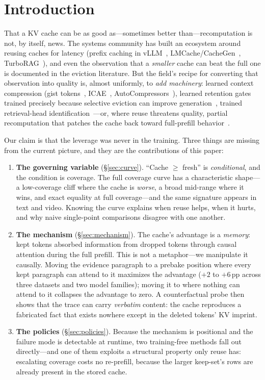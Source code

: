 \documentclass{article} %
\newcommand{\pp}{\,\mathrm{pp}}
\begin{document}
\section{Introduction}
\label{sec:intro}

That a KV cache can be as good as---sometimes better than---recomputation is not, by itself, news. The systems community has built an ecosystem around reusing caches for latency (prefix caching in vLLM~\citep{vllm}, LMCache/CacheGen~\citep{cachegen}, TurboRAG~\citep{turborag}), and even the observation that a \emph{smaller} cache can beat the full one is documented in the eviction literature. But the field's recipe for converting that observation into quality is, almost uniformly, to \emph{add machinery}: learned context compression (gist tokens~\citep{gist}, ICAE~\citep{icae}, AutoCompressors~\citep{autocompressors}), learned retention gates trained precisely because selective eviction can improve generation~\citep{maketokencount}, trained retrieval-head identification~\citep{duoattention}---or, where reuse threatens quality, partial recomputation that patches the cache back toward full-prefill behavior~\citep{cacheblend}.

Our claim is that the leverage was never in the training. Three things are missing from the current picture, and they are the contributions of this paper:

\begin{enumerate}[leftmargin=2em]
\item \textbf{The governing variable} (\S\ref{sec:curve}). ``Cache $\geq$ fresh'' is \emph{conditional}, and the condition is coverage. The full coverage curve has a characteristic shape---a low-coverage cliff where the cache is \emph{worse}, a broad mid-range where it wins, and exact equality at full coverage---and the same signature appears in text and video. Knowing the curve explains when reuse helps, when it hurts, and why naive single-point comparisons disagree with one another.
\item \textbf{The mechanism} (\S\ref{sec:mechanism}). The cache's advantage is a \emph{memory}: kept tokens absorbed information from dropped tokens through causal attention during the full prefill. This is not a metaphor---we manipulate it causally. Moving the evidence paragraph to a prebake position where every kept paragraph can attend to it maximizes the advantage ($+2$ to $+6\pp$ across three datasets and two model families); moving it to where nothing can attend to it collapses the advantage to zero. A counterfactual probe then shows that the trace can carry \emph{verbatim} content: the cache reproduces a fabricated fact that exists nowhere except in the deleted tokens' KV imprint.
\item \textbf{The policies} (\S\ref{sec:policies}). Because the mechanism is positional and the failure mode is detectable at runtime, two training-free methods fall out directly---and one of them exploits a structural property only reuse has: escalating coverage costs no re-prefill, because the larger keep-set's rows are already present in the stored cache.
\end{enumerate}
\end{document}
